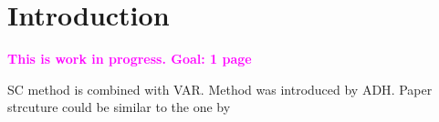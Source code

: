 \section{Introduction}

\textcolor{magenta}{\textbf{This is work in progress. Goal: 1 page}}

\ac{SC} method is combined with \ac{VAR}. Method was introduced by \ac{ADH}. Paper strcuture could be similar to the one by \cite{doudchenko:2016}
